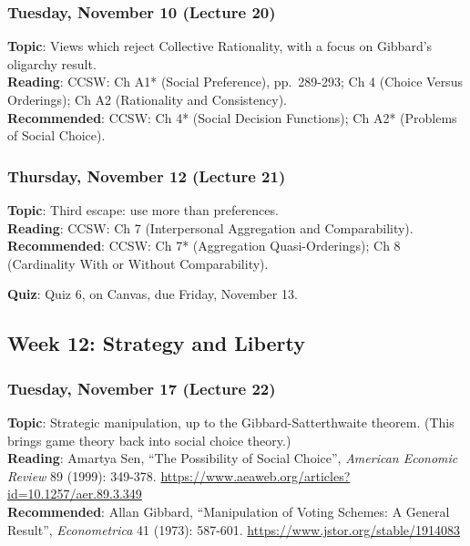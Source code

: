 \documentclass[
  letterpaper,
  DIV=11,
  numbers=noendperiod]{scrartcl}
\begin{document}
\subsubsection{Tuesday, November 10 (Lecture
20)}\label{tuesday-november-10-lecture-20}

\textbf{Topic}: Views which reject Collective Rationality, with a focus
on Gibbard's oligarchy result.\\
\textbf{Reading}: CCSW: Ch A1* (Social Preference), pp.~289-293; Ch 4
(Choice Versus Orderings); Ch A2 (Rationality and Consistency).\\
\textbf{Recommended}: CCSW: Ch 4* (Social Decision Functions); Ch A2*
(Problems of Social Choice).

\subsubsection{Thursday, November 12 (Lecture
21)}\label{thursday-november-12-lecture-21}

\textbf{Topic}: Third escape: use more than preferences.\\
\textbf{Reading}: CCSW: Ch 7 (Interpersonal Aggregation and
Comparability).\\
\textbf{Recommended}: CCSW: Ch 7* (Aggregation Quasi-Orderings); Ch 8
(Cardinality With or Without Comparability).

\textbf{Quiz}: Quiz 6, on Canvas, due Friday, November 13.

\subsection{Week 12: Strategy and
Liberty}\label{week-12-strategy-and-liberty}

\subsubsection{Tuesday, November 17 (Lecture
22)}\label{tuesday-november-17-lecture-22}

\textbf{Topic}: Strategic manipulation, up to the Gibbard-Satterthwaite
theorem. (This brings game theory back into social choice theory.)\\
\textbf{Reading}: Amartya Sen, ``The Possibility of Social Choice'',
\emph{American Economic Review} 89 (1999): 349-378.
\url{https://www.aeaweb.org/articles?id=10.1257/aer.89.3.349}\\
\textbf{Recommended}: Allan Gibbard, ``Manipulation of Voting Schemes: A
General Result'', \emph{Econometrica} 41 (1973): 587-601.
\url{https://www.jstor.org/stable/1914083}
\end{document}
